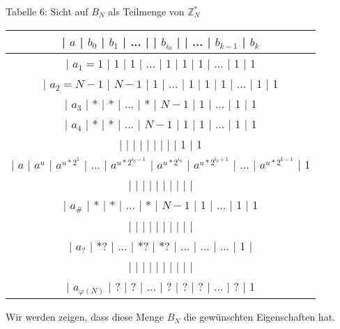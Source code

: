 \documentclass[a4paper]{article}
\begin{document}
\begin{multicols}{3}
        Tabelle 6: Sicht auf $B_N$ als Teilmenge von $\mathbb{Z}^*_N$
        \begin{tabular}{c}
            | $a$       | $b_0$ | $b_1$    | ... |          | $b_{i_0}$    |          | ... | $b_{k-1}$    | $b_k$                        \\\hline
            | $a_1=1$     | 1   | 1      | ... | 1         | 1        | 1         | ... | 1        | 1                                    \\
            | $a_2=N-1$    | $N-1$ | 1      | ... | 1         | 1        | 1         | ... | 1        | 1                                 \\
            | $a_3$      | *   | *      | ... | *         | $N-1$      | 1         | ... | 1        | 1                                   \\
            | $a_4$      | *   | *      | ... | $N-1$       | 1        | 1         | ... | 1        | 1                                   \\
            |         |    |       |   |          |         |          |   | 1        | 1                                                 \\
            | $a$       | $a^u$ | $a^{u*2^1}$ | ... | $a^{u*2^{i_0-1}}$ | $a^{u*2^{i_0}}$ | $a^{u*2^{i_0+1}}$ | ... | $a^{u*2^{k-1}}$ | 1 \\
            |         |    |       |   |          |         |          |   |         |                                                    \\
            | $a_{\#}$      | *   | *      | ... | *         | $N-1$      | 1         | ... | 1        | 1                                \\
            |         |    |       |   |          |         |          |   |         |                                                    \\
            | $a_?$      | $*?$ | ...     | $*?$ | $*?$       | ...       | ...        | ... | 1        |                                 \\
            |         |    |       |   |          |         |          |   |         |                                                    \\
            | $a_{\varphi(N)}$ | ?   | ?      | ... | ?         | ?        | ?         | ... | ?        | 1
        \end{tabular}


        Wir werden zeigen, dass diese Menge $B_N$ die gewünschten Eigenschaften hat.


\end{multicols}
\end{document}
